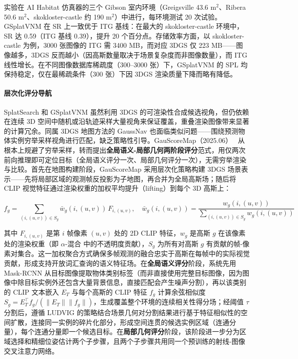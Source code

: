 实验在 AI Habitat 仿真器的三个 Gibson 室内环境（Greigsville 43.6 m$^2$、Ribera 50.6 m$^2$、skokloster-castle 约 190 m$^2$）中进行，每环境测试 20 次试验。GSplatVNM 在 SR 上一致优于 ITG 基线：在最大的 skokloster-castle 环境中，SR 达 0.59（ITG 基线 0.39），提升 20 个百分点。存储效率方面，以 skokloster-castle 为例，3000 张图像的 ITG 需 3400 MB，而对应 3DGS 仅 223 MB——图像越多，3DGS 反而越小（因高斯数量取决于场景复杂度而非图像数量），而 ITG 线性增长。在不同图像数据库稀疏度（300--3000 张）下，GSplatVNM 的 SPL 均保持稳定，仅在最稀疏条件（300 张）下因 3DGS 渲染质量下降而略有降低。

\paragraph{层次化评分导航}

SplatSearch 和 GSplatVNM 虽然利用 3DGS 的可渲染性合成候选视角，但仍依赖在连续 3D 空间中随机或沿轨迹采样大量视角来保证覆盖，重叠渲染图像带来显著的计算冗余。同属 3DGS 地图方法的 GaussNav 也面临类似问题——围绕预测物体实例穷举采样视角进行匹配，缺乏策略性引导。GauScoreMap（2025.06）~\cite{2506_07338} 从根本上规避了穷举采样，转而提出\textbf{全局语义-局部几何两阶段评分}范式，用仅两次前向推理即可定位目标（全局语义评分一次、局部几何评分一次），无需穷举渲染与比较。首先在地图构建阶段，GauScoreMap 采用层次化策略构建 3DGS 场景表示——先将局部区域的观测帧反投影为子地图，再合并为全局高斯场；随后将 CLIP 视觉特征通过渲染权重的加权平均提升（lifting）到每个 3D 高斯上：

\begin{equation}
f_g = \sum_{(i,(u,v)) \in S_g} \bar{w}_g(i,(u,v)) \, F_{i,(u,v)}, \quad \bar{w}_g(i,(u,v)) = \frac{w_g(i,(u,v))}{\sum_{(i,(u,v)) \in S_g} w_g(i,(u,v))}
\end{equation}

其中 $F_{i,(u,v)}$ 是第 $i$ 帧像素 $(u,v)$ 处的 2D CLIP 特征，$w_g$ 是高斯 $g$ 在该像素处的渲染权重（即 $\alpha$-混合 中的不透明度贡献），$S_g$ 为所有对高斯 $g$ 有贡献的帧-像素对集合。这一加权聚合方式确保多帧观测的融合忠实于高斯在每帧中的实际视觉贡献，形成支持开放词汇查询的语义特征场。在\textbf{全局语义评分}阶段，系统先用 Mask-RCNN 从目标图像提取物体类别标签（而非直接使用完整目标图像，因为图像中除目标实例外还包含大量背景信息，直接匹配会产生噪声分割），再以该类别的 CLIP 文本嵌入 $E_T$ 与每个高斯的 CLIP 特征 $f_g$ 计算余弦相似度 $S_g = E_T^\top f_g / (\|E_T\| \|f_g\|)$，生成覆盖整个环境的连续相关性得分场；经阈值 $\tau$ 分割后，遵循 LUDVIG 的策略结合场景几何对分割结果进行基于特征相似性的空间扩散，连接同一实例的碎片化部分，形成空间连贯的候选实例区域（连通分量），每个连通分量即一个候选目标。在\textbf{局部几何评分}阶段，该阶段进一步分为区域选择和精细位姿估计两个子步骤，且两个子步骤共用同一个预训练的射线-图像交叉注意力网络。

